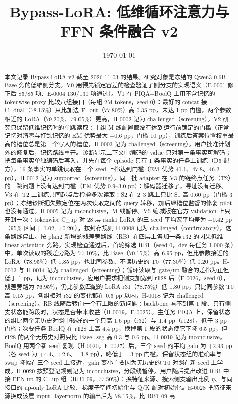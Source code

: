 \documentclass[11pt]{article}
\title{Bypass-LoRA: 低维循环注意力与 FFN 条件融合 v2}
\author{}
\date{\today}
\begin{document}
\maketitle

\begin{abstract}
本文记录 Bypass-LoRA v2 截至 2026-11-03 的结果。研究对象是冻结的 Qwen3-0.6B-Base 旁的低维侧分支。V0 用预先锁定容差的检查验证了侧分支的实现语义（E-0001 修正后 85/85 项、E-0004 130/130 项通过）。V1 在 PIQA+BoolQ 上用不含记忆的 tokenwise proxy 比较八组接口（每组 2M tokens，seed 0）：最好的 concat 接口 C\_dual（78.15\%）只比加法 F\_out（77.80\%）高 0.35 pp，未达 1 pp 门槛，两个参数相近的 LoRA（79.20\%、79.05\%）更高，H-0002 记为 challenged（screening）。V2 研究只保留低维记忆时的单跳读取：十组 M 线配置都没有达到运行前锁定的门槛（正常记忆对清零与打乱记忆的 EM 优势最大 +0.6 pp，门槛 10 pp），训练后答案位置权重最高的槽位总是第一个写入的槽位，H-0003 记为 challenged（screening）。用户批准计划外的修复后，记忆路线重开。诊断显示上下文中编码的 value 只对第一条事实可解码；把每条事实单独编码后写入，并先在每个 episode 只有 1 条事实的任务上训练（D5 配方），16 条事实的单跳读取在三个 seed 上都达到门槛（EM 优势 41.1、47.8、46.2 pp），H-0012 记为 supported（screening）。同一批 adapter 在 V3 的链终点任务（T2）的一跳问题上没有达到门槛（EM 优势 0.9--3.0 pp）：解码器迁移了，寻址没有迁移。V3 在 T2 上训练共同起点后检验多次读取：S2 在 2--3 跳上只比 S1 高 0.60 pp（门槛 3 pp）；冻结诊断把失败定位在两次读取之间的 query 转移，加后继槽位监督的修复 pilot 也没有通过。H-0005 记为 inconclusive，M 线暂停。V5 缩减版在官方 validation 上只开封一次：tokenwise C\_up 对 28 层 rank1 LoRA 的三 seed 平均宏平均差为 $-$0.42 pp（95\% 区间 [$-$1.02, +0.20]），按封存规则 H-0008 记为 challenged（confirmatory），这条路线停止。按 plan2 新增的残差旁路线（RB）在四层上各加一条 r32 的因果低维 linear attention 旁路。实现检查通过后，首轮筛选 RB1（seed 0，dev 每任务 1,000 条）中，单次读取的残差旁路为 77.10\%，比 Base（70.15\%）高 6.95 pp，但比参数接近的 LoRA（78.95\%）低 1.85 pp，也比同参数、不读历史的 T0（77.30\%）低 0.20 pp。H-0013 与 H-0014 记为 challenged（screening）；循环读取与 gate/up 融合的差都为正但低于 1 pp，记为 inconclusive。应用户要求把侧支加宽到 r128 后（E-0026，seed 0），残差旁路为 76.95\%，仍比参数匹配的 LoRA r31（78.75\%）低 1.80 pp，只比同参数 T0 高 0.15 pp，各组相对 r32 的变化都在 0.5 pp 以内，H-0018 记为 challenged（screening）。RB 线随后转向一个有上限的新问题：backbone 看不到第 1 段、只有侧支状态能跨段时，状态是否带来收益（H-0019，E-0025）。主任务 PIQA 上，保留状态的组比两个无历史对照中较好的一个只高 1.6 pp（r32）与 1.4 pp（r128），低于 3 pp 门槛；次要任务 BoolQ 在 r128 上高 4.4 pp，换掉第 1 段的状态使它下降 6.5 pp，但 r128 的两个无历史对照只比 Base\_seg 高 0.3 与 0.6 pp。H-0019 记为 inconclusive。BoolQ 用两个新 seed 复现（H-0020，E-0027）后，三个 seed 的平均 gain 为 +2.93 pp（各 seed 为 +4.4、+2.6、+1.8 pp），略低于 +3 pp 门槛。保留状态组的准确率与 swap 降幅在三个 seed 上接近，gain 变小主要因为无历史的 T0 对照在新 seed 上学成。H-0020 按预登记规则记为 inconclusive，分段线暂停。用户随后提出改进 RB1 中接 FFN up 的 C\_up 组（RB1-09，77.50\%）：换特征来源、搜索侧支输出比例 $\eta$、与同接口的 up-only LoRA 比较、梯度子空间初始化与 Q/K 配对初始化。E-0028 把特征来源换成该层 input\_layernorm 的输出后为 78.15\%，比 RB1-09 高 
\end{abstract}
\end{document}
